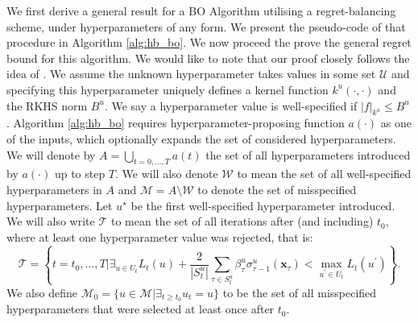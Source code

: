 \documentclass{article}
\theoremstyle{plain}
\theoremstyle{definition}
\theoremstyle{remark}
\theoremstyle{plain}
\begin{document}
We first derive a general result for a BO Algorithm utilising a regret-balancing scheme, under hyperparameters of any form. We present the pseudo-code of that procedure in Algorithm \ref{alg:hb_bo}. We now proceed the prove the general regret bound for this algorithm. We would like to note that our proof closely follows the idea of \cite{pacchiano2020regret}. We assume the unknown hyperparameter takes values in some set $\mathcal{U}$ and specifying this hyperparameter uniquely defines a kernel function $k^u(\cdot, \cdot)$ and the RKHS norm $B^u$. We say a hyperparameter value is well-specified if $|f|_{k^u} \le B^u$. Algorithm \ref{alg:hb_bo} requires hyperparameter-proposing function $a(\cdot)$ as one of the inputs, which optionally expands the set of considered hyperparameters. We will denote by $A = \bigcup_{t=0,\dots,T} a(t)$  the set of all hyperparameters introduced by $a(\cdot)$ up to step $T$. We will also denote $\mathcal{W}$ to mean the set of all well-specified hyperparameters in $A$ and $\mathcal{M} = A \setminus \mathcal{W}$ to denote the set of misspecified hyperparameters. Let $u^\star$ be the first well-specified hyperparameter introduced.  We will also write $\mathcal{T}$ to mean the set of all iterations after (and including) $t_0$, where at least one hyperparameter value was rejected, that is:
\begin{equation*}
    \mathcal{T} = \left\{ t=t_0,\dots,T \Bigg | \exists_{u \in U_t} L_t(u) +  \frac{2}{|S_t^{u}|} \sum_{\tau \in S_t^u} \beta_\tau^u \sigma^u_{\tau-1}(\bm{x}_\tau)  <  \max_{u^\prime \in U_{t}} L_t(u^\prime) \right\} .
\end{equation*}
We also define $\mathcal{M}_0= \{u \in \mathcal{M}| \exists_{t \ge t_0} u_t = u\}$ to be the set of all misspecified hyperparameters that were selected at least once after $t_0$.
\end{document}
